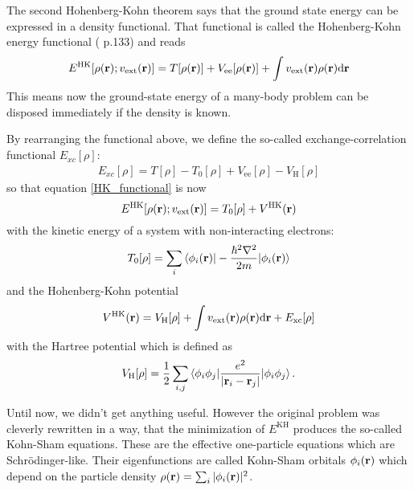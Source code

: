 	The second Hohenberg-Kohn theorem says that the ground state energy can be expressed in a density functional. That functional is called the Hohenberg-Kohn energy functional (\cite{solid_state_book} p.133) and reads
	\begin{equation} \label{HK_functional}
		E^{\text{HK}}[\rho(\textbf{r});v_{\text{ext}}(\textbf{r})] = 
		T[\rho(\textbf{r})] + V_{\text{ee}}[\rho(\textbf{r})] + \int v_{\text{ext}}(\textbf{r}) \rho(\textbf{r}) \mathrm{d} \textbf{r} 
	\end{equation}
	This means now the ground-state energy of a many-body problem can be disposed immediately if the density is known. 

	By rearranging the functional above, we define the so-called exchange-correlation functional $E_{xc}[\rho]$:
	\begin{align}
	E_{xc}[\rho] = T[\rho] - T_0 [\rho] + V_{\text{ee}} [\rho] - V_\text{H} [\rho]
	\end{align}
	so that equation \eqref{HK_functional} is now
	\begin{equation}
	E^{\text{HK}}[\rho(\textbf{r}); v_{\text{ext}}(\textbf{r})] = 
	T_0 [\rho] + V^\text{HK}(\textbf{r})
	\end{equation}
	with the kinetic energy of a system with non-interacting electrons:
	\begin{equation}
		T_0 [\rho] = \sum_i \braket{\phi_i(\textbf{r})| -\frac{\hbar^2 \nabla^2}{2m} | \phi_i(\textbf{r})}
	\end{equation}  
	and the Hohenberg-Kohn potential
	\begin{equation}
		V^\text{HK}(\textbf{r})= V_\text{H} [\rho] + \int v_{\text{ext}}(\textbf{r}) \rho(\textbf{r}) \mathrm{d} \textbf{r} + E_{\text{xc}} [\rho]
	\end{equation}
	with the Hartree potential which is defined as
	\begin{equation}
		V_\text{H}[\rho]= \frac{1}{2} \sum_{i,j} \braket{\phi_i \phi_j| \frac{e^2}{|\textbf{r}_i-\textbf{r}_j|} |\phi_i \phi_j}.
	\end{equation}
	
	Until now, we didn't get anything useful. However the original problem was cleverly rewritten in a way, that the minimization of $E^\text{KH}$ produces the so-called Kohn-Sham equations. These are the effective one-particle equations which are Schrödinger-like. Their eigenfunctions are called Kohn-Sham orbitals $\phi_i(\textbf{r})$ which depend on the particle density $\rho(\textbf{r}) = \sum_i |\phi_i(\textbf{r})|^2$.

